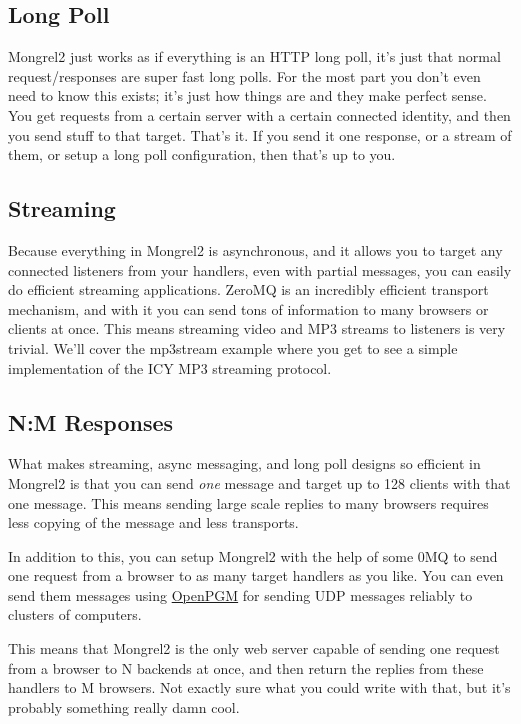 \subsection{Long Poll}

Mongrel2 just works as if everything is an HTTP long poll, it's just that normal request/responses
are super fast long polls.  For the most part you don't even need to know this exists; it's just
how things are and they make perfect sense.  You get requests from a certain server with a
certain connected identity, and then you send stuff to that target.  That's it.  If you send it
one response, or a stream of them, or setup a long poll configuration, then that's up to you.


\subsection{Streaming}

Because everything in Mongrel2 is asynchronous, and it allows you to target any connected listeners
from your handlers, even with partial messages, you can easily do efficient streaming applications.  ZeroMQ
is an incredibly efficient transport mechanism, and with it you can send tons of information to many
browsers or clients at once.  This means streaming video and MP3 streams to listeners is very
trivial.  We'll cover the mp3stream example where you get to see a simple implementation of the ICY
MP3 streaming protocol.

\subsection{N:M Responses}

What makes streaming, async messaging, and long poll designs so efficient in Mongrel2 is that you can send
\emph{one} message and target up to 128 clients with that one message.  This means sending large scale replies
to many browsers requires less copying of the message and less transports.

In addition to this, you can setup Mongrel2 with the help of some 0MQ to send
one request from a browser to as many target handlers as you like.  You can
even send them messages using \href{http://code.google.com/p/openpgm/}{OpenPGM}
for sending UDP messages reliably to clusters of computers.

This means that Mongrel2 is the only web server capable of sending one request
from a browser to N backends at once, and then return the replies from these
handlers to M browsers.  Not exactly sure what you could write with that, but
it's probably something really damn cool.


